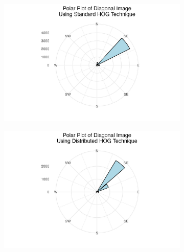 \documentclass[
  letterpaper,
  DIV=11,
  numbers=noendperiod]{scrreprt}
\begin{document}
\begin{figure}
\begin{minipage}{0.25\linewidth}
\begin{figure}[H]
{}


\end{figure}%

\end{minipage}%
%
\begin{minipage}{0.25\linewidth}

\begin{figure}[H]

{\centering \includegraphics{images/plots/diagonal/diag_standard_polar_plot.jpg}

}


\end{figure}%

\end{minipage}%
%
\begin{minipage}{0.25\linewidth}

\begin{figure}[H]

{\centering \includegraphics{images/plots/diagonal/diag_contribution_polar_plot.jpg}

}
\end{figure}
\end{minipage}
\end{figure}
\end{document}

